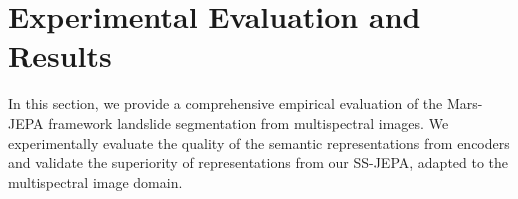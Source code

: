 \section{Experimental Evaluation and Results}
\label{sec:exp-res}

In this section, we provide a comprehensive empirical evaluation of the Mars-JEPA framework landslide segmentation from multispectral images. We experimentally evaluate the quality of the semantic representations from encoders and validate the superiority of representations from our SS-JEPA, adapted to the multispectral image domain.










